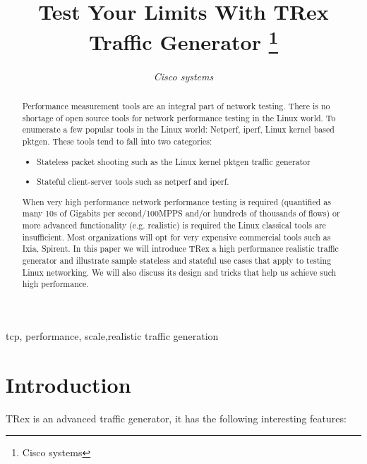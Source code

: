 \documentclass[conference]{IEEEtran}
\begin{document}
\title{Test Your Limits With TRex Traffic Generator 
\thanks{Cisco systems}
}

\author{
\textit{Cisco systems}\\
}

\maketitle

\begin{abstract}
Performance measurement tools are an integral part of network testing. 
There is no shortage of open source tools for network performance
testing in the Linux world. 
To enumerate a few popular tools in the Linux world: Netperf, iperf, Linux kernel based pktgen.
These tools tend to fall into two categories:
\begin{itemize}
  \item Stateless packet shooting such as the Linux kernel pktgen traffic generator 
  \item Stateful client-server tools such as netperf and iperf. 
\end{itemize}  
When very high performance network performance testing is required (quantified as
many 10s of Gigabits per second/100MPPS and/or hundreds of thousands of flows) or more advanced functionality (e.g. realistic) is required the
Linux classical tools are insufficient. Most organizations
will opt for very expensive commercial tools such as Ixia, Spirent. 
In this paper we will introduce TRex a high performance realistic traffic generator
and illustrate sample stateless and stateful use cases that apply to testing
Linux networking. We will also discuss its design and tricks that help us
achieve such high performance.
\end{abstract}


\begin{IEEEkeywords}
tcp, performance, scale,realistic traffic generation 
\end{IEEEkeywords}

\section{Introduction}

TRex \cite{b1} is an advanced traffic generator, it has the following interesting features:
\end{document}
